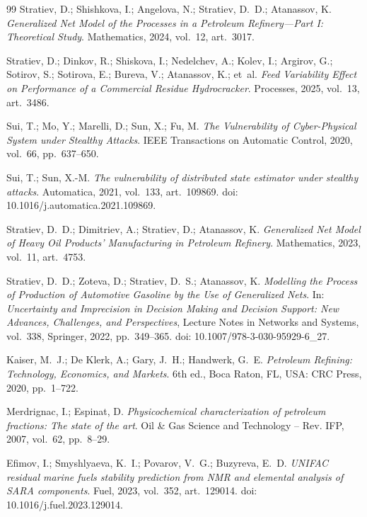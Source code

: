 \begin{thebibliography}{99}
Stratiev, D.; Shishkova, I.; Angelova, N.; Stratiev, D.~D.; Atanassov, K.
\newblock \emph{Generalized Net Model of the Processes in a Petroleum Refinery—Part I: Theoretical Study}.
\newblock Mathematics, 2024, vol.~12, art.~3017.

Stratiev, D.; Dinkov, R.; Shiskova, I.; Nedelchev, A.; Kolev, I.; Argirov, G.; Sotirov, S.; Sotirova, E.; Bureva, V.; Atanassov, K.; et~al.
\newblock \emph{Feed Variability Effect on Performance of a Commercial Residue Hydrocracker}.
\newblock Processes, 2025, vol.~13, art.~3486.

Sui, T.; Mo, Y.; Marelli, D.; Sun, X.; Fu, M.
\newblock \emph{The Vulnerability of Cyber-Physical System under Stealthy Attacks}.
\newblock IEEE Transactions on Automatic Control, 2020, vol.~66, pp.~637--650.

Sui, T.; Sun, X.-M.
\newblock \emph{The vulnerability of distributed state estimator under stealthy attacks}.
\newblock Automatica, 2021, vol.~133, art.~109869.
\newblock doi: 10.1016/j.automatica.2021.109869.

Stratiev, D.~D.; Dimitriev, A.; Stratiev, D.; Atanassov, K.
\newblock \emph{Generalized Net Model of Heavy Oil Products' Manufacturing in Petroleum Refinery}.
\newblock Mathematics, 2023, vol.~11, art.~4753.

Stratiev, D.~D.; Zoteva, D.; Stratiev, D.~S.; Atanassov, K.
\newblock \emph{Modelling the Process of Production of Automotive Gasoline by the Use of Generalized Nets}.
\newblock In: \emph{Uncertainty and Imprecision in Decision Making and Decision Support: New Advances, Challenges, and Perspectives},
Lecture Notes in Networks and Systems, vol.~338, Springer, 2022, pp.~349--365.
\newblock doi: 10.1007/978-3-030-95929-6\_27.

Kaiser, M.~J.; De Klerk, A.; Gary, J.~H.; Handwerk, G.~E.
\newblock \emph{Petroleum Refining: Technology, Economics, and Markets}.
\newblock 6th ed., Boca Raton, FL, USA: CRC Press, 2020, pp.~1--722.

Merdrignac, I.; Espinat, D.
\newblock \emph{Physicochemical characterization of petroleum fractions: The state of the art}.
\newblock Oil \& Gas Science and Technology -- Rev. IFP, 2007, vol.~62, pp.~8--29.

Efimov, I.; Smyshlyaeva, K.~I.; Povarov, V.~G.; Buzyreva, E.~D.
\newblock \emph{UNIFAC residual marine fuels stability prediction from NMR and elemental analysis of SARA components}.
\newblock Fuel, 2023, vol.~352, art.~129014.
\newblock doi: 10.1016/j.fuel.2023.129014.


\end{thebibliography}
